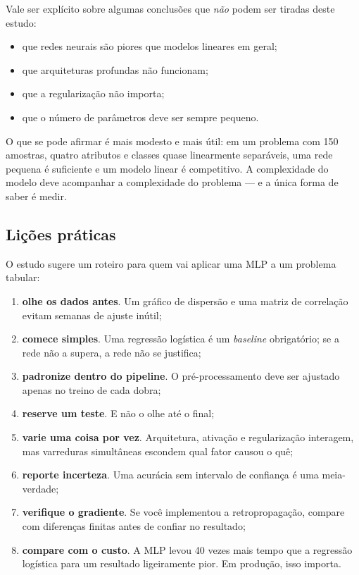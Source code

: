Vale ser explícito sobre algumas conclusões que \emph{não} podem ser tiradas deste estudo:

\begin{itemize}
	\item que redes neurais são piores que modelos lineares em geral;
	\item que arquiteturas profundas não funcionam;
	\item que a regularização não importa;
	\item que o número de parâmetros deve ser sempre pequeno.
\end{itemize}

O que se pode afirmar é mais modesto e mais útil: em um problema com 150 amostras, quatro
atributos e classes quase linearmente separáveis, uma rede pequena é suficiente e um modelo
linear é competitivo. A complexidade do modelo deve acompanhar a complexidade do problema --- e a
única forma de saber é medir.

\subsection{Lições práticas}

O estudo sugere um roteiro para quem vai aplicar uma MLP a um problema tabular:

\begin{enumerate}
	\item \textbf{olhe os dados antes}. Um gráfico de dispersão e uma matriz de correlação evitam
	      semanas de ajuste inútil;
	\item \textbf{comece simples}. Uma regressão logística é um \emph{baseline} obrigatório; se a
	      rede não a supera, a rede não se justifica;
	\item \textbf{padronize dentro do pipeline}. O pré-processamento deve ser ajustado apenas no
	      treino de cada dobra;
	\item \textbf{reserve um teste}. E não o olhe até o final;
	\item \textbf{varie uma coisa por vez}. Arquitetura, ativação e regularização interagem, mas
	      varreduras simultâneas escondem qual fator causou o quê;
	\item \textbf{reporte incerteza}. Uma acurácia sem intervalo de confiança é uma meia-verdade;
	\item \textbf{verifique o gradiente}. Se você implementou a retropropagação, compare com
	      diferenças finitas antes de confiar no resultado;
	\item \textbf{compare com o custo}. A MLP levou 40 vezes mais tempo que a regressão logística
	      para um resultado ligeiramente pior. Em produção, isso importa.
\end{enumerate}

